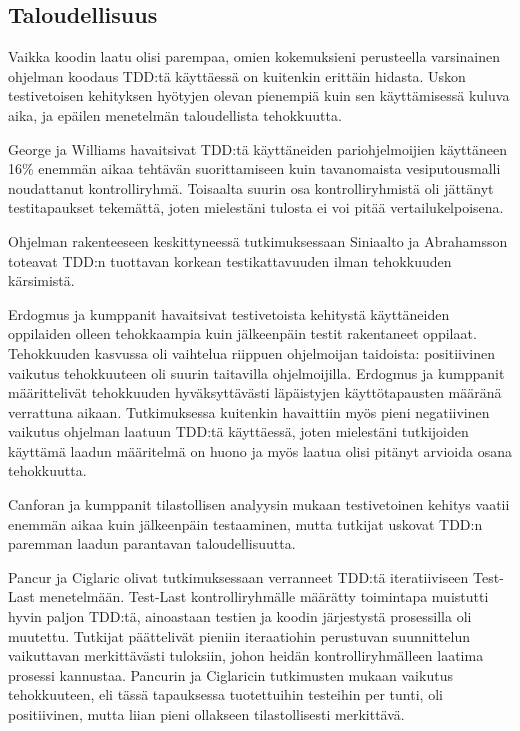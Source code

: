 \documentclass[finnish]{tktltiki2}
\theoremstyle{definition}
\theoremstyle{remark}
\begin{document}


\subsection{Taloudellisuus}

Vaikka koodin laatu olisi parempaa, omien kokemuksieni perusteella varsinainen ohjelman koodaus TDD:tä käyttäessä on kuitenkin erittäin hidasta. Uskon testivetoisen kehityksen hyötyjen olevan pienempiä kuin sen käyttämisessä kuluva aika, ja epäilen menetelmän taloudellista tehokkuutta.

George ja Williams \cite{George04} havaitsivat TDD:tä käyttäneiden pariohjelmoijien käyttäneen 16\% enemmän aikaa tehtävän suorittamiseen kuin tavanomaista vesiputousmalli noudattanut kontrolliryhmä. Toisaalta suurin osa kontrolliryhmistä oli jättänyt testitapaukset tekemättä, joten mielestäni tulosta ei voi pitää vertailukelpoisena.

Ohjelman rakenteeseen keskittyneessä tutkimuksessaan Siniaalto ja Abrahamsson \cite{Siniaalto07} toteavat TDD:n tuottavan korkean testikattavuuden ilman tehokkuuden kärsimistä.

Erdogmus ja kumppanit \cite{Erdogmus05} havaitsivat testivetoista kehitystä käyttäneiden oppilaiden olleen tehokkaampia kuin jälkeenpäin testit rakentaneet oppilaat. Tehokkuuden kasvussa oli vaihtelua riippuen ohjelmoijan taidoista: positiivinen vaikutus tehokkuuteen oli suurin taitavilla ohjelmoijilla. Erdogmus ja kumppanit määrittelivät tehokkuuden hyväksyttävästi läpäistyjen käyttötapausten määränä verrattuna aikaan. Tutkimuksessa kuitenkin havaittiin myös pieni negatiivinen vaikutus ohjelman laatuun TDD:tä käyttäessä, joten mielestäni tutkijoiden käyttämä laadun määritelmä on huono ja myös laatua olisi pitänyt arvioida osana tehokkuutta. 

Canforan ja kumppanit \cite{Canfora06} tilastollisen analyysin mukaan testivetoinen kehitys vaatii enemmän aikaa kuin jälkeenpäin testaaminen, mutta tutkijat uskovat TDD:n paremman laadun parantavan taloudellisuutta.

Pancur ja Ciglaric \cite{Pancur11} olivat tutkimuksessaan verranneet TDD:tä iteratiiviseen Test-Last menetelmään. Test-Last kontrolliryhmälle määrätty toimintapa muistutti hyvin paljon TDD:tä, ainoastaan testien ja koodin järjestystä prosessilla oli muutettu. Tutkijat päättelivät pieniin iteraatiohin perustuvan suunnittelun vaikuttavan merkittävästi tuloksiin, johon heidän kontrolliryhmälleen laatima prosessi kannustaa. Pancurin ja Ciglaricin tutkimusten mukaan vaikutus tehokkuuteen, eli tässä tapauksessa tuotettuihin testeihin per tunti,  oli positiivinen, mutta liian pieni ollakseen tilastollisesti merkittävä.
\end{document}
